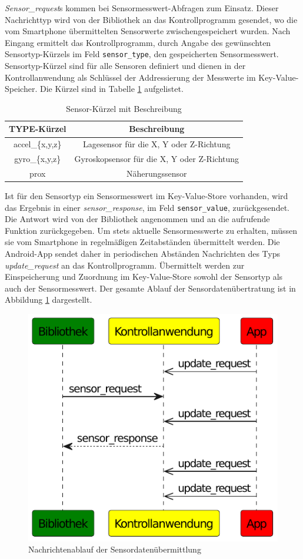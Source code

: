 \documentclass[11pt,a4paper]{report}
\begin{document}
\textit{Sensor\_request}s kommen bei Sensormesswert-Abfragen zum Einsatz.
Dieser Nachrichttyp wird von der Bibliothek an das Kontrollprogramm gesendet, wo die vom Smartphone übermittelten Sensorwerte zwischengespeichert wurden.
Nach Eingang ermittelt das Kontrollprogramm, durch Angabe des gewünschten Sensortyp-Kürzels im Feld \texttt{sensor\_type}, den gespeicherten Sensormesswert.
Sensortyp-Kürzel sind für alle Sensoren definiert und dienen in der Kontrollanwendung als Schlüssel der Addressierung der Messwerte im Key-Value-Speicher.
Die Kürzel sind in Tabelle \ref{tab:sensor_types} aufgelistet. 
\begin{table}[htbp]
  \centering
  \begin{tabular}{|c|c|}
      \hline
      \textbf{TYPE-Kürzel} & \textbf{Beschreibung} \\
      \hline
      accel\_\{x,y,z\} & Lagesensor für die X, Y oder Z-Richtung \\
      \hline
       gyro\_\{x,y,z\} & Gyroskopsensor für die X, Y oder Z-Richtung \\
      \hline
      prox & Näherungssensor \\
      \hline
  \end{tabular}
  \caption{Sensor-Kürzel mit Beschreibung}
  \label{tab:sensor_types}
\end{table}
Ist für den Sensortyp ein Sensormesswert im Key-Value-Store vorhanden, wird das Ergebnis in einer \textit{sensor\_response}, im Feld \texttt{sensor\_value}, zurückgesendet.
Die Antwort wird von der Bibliothek angenommen und an die aufrufende Funktion zurückgegeben.
Um stets aktuelle Sensormesswerte zu erhalten, müssen sie vom Smartphone in regelmäßigen Zeitabständen übermittelt werden.
Die Android-App sendet daher in periodischen Abständen Nachrichten des Typs \textit{update\_request} an das Kontrollprogramm.
Übermittelt werden zur Einspeicherung und Zuordnung im Key-Value-Store sowohl der Sensortyp als auch der Sensormesswert.
Der gesamte Ablauf der Sensordatenübertratung ist in Abbildung \ref{fig:message_flow_requests} dargestellt.
\begin{figure}[htbp]
\centering
\includegraphics[width=.6\textwidth]{images/message_flow_sensor}
\caption{Nachrichtenablauf der Sensordatenübermittlung}
\label{fig:message_flow_requests}
\end{figure}
\end{document}

